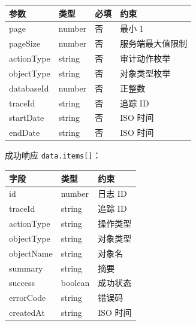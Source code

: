 \documentclass[
  a4paper,
  UTF8]{ctexart}
\begin{document}
\begin{longtable}[]{@{}llll@{}}
\toprule
参数 & 类型 & 必填 & 约束 \\
\midrule
\endhead
page & number & 否 & 最小 1 \\
pageSize & number & 否 & 服务端最大值限制 \\
actionType & string & 否 & 审计动作枚举 \\
objectType & string & 否 & 对象类型枚举 \\
databaseId & number & 否 & 正整数 \\
traceId & string & 否 & 追踪 ID \\
startDate & string & 否 & ISO 时间 \\
endDate & string & 否 & ISO 时间 \\
\bottomrule
\end{longtable}

成功响应 \texttt{data.items{[}{]}}：

\begin{longtable}[]{@{}lll@{}}
\toprule
字段 & 类型 & 约束 \\
\midrule
\endhead
id & number & 日志 ID \\
traceId & string & 追踪 ID \\
actionType & string & 操作类型 \\
objectType & string & 对象类型 \\
objectName & string & 对象名 \\
summary & string & 摘要 \\
success & boolean & 成功状态 \\
errorCode & string & 错误码 \\
createdAt & string & ISO 时间 \\
\bottomrule
\end{longtable}
\end{document}
